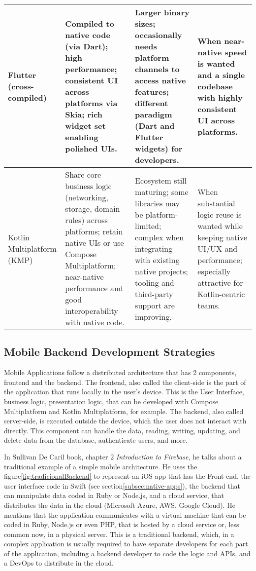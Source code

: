 \begin{table}[ht]
\begin{tabularx}{\textwidth}{|p{3.2cm}|Y|Y|Y|}
        Flutter (cross-compiled) &
        Compiled to native code (via Dart); high performance; consistent UI across platforms via Skia; rich widget set enabling polished UIs. &
        Larger binary sizes; occasionally needs platform channels to access native features; different paradigm (Dart and Flutter widgets) for developers. &
        When near-native speed is wanted and a single codebase with highly consistent UI across platforms. \\

        \hline

        Kotlin Multiplatform (KMP) &
        Share core business logic (networking, storage, domain rules) across platforms; retain native UIs or use Compose Multiplatform; near-native performance and good interoperability with native code. &
        Ecosystem still maturing; some libraries may be platform-limited; complex when integrating with existing native projects; tooling and third-party support are improving. &
        When  substantial logic reuse is wanted while keeping native UI/UX and performance; especially attractive for Kotlin-centric teams. \\
        \hline
    \end{tabularx}
\end{table}

\subsection{Mobile Backend Development Strategies}\label{sec:backend-strategies}

Mobile Applications follow a distributed architecture that has 2 components, frontend and the backend.
The frontend, also called the client-side is the part of the application that runs locally in the user's device.
This is the User Interface, business logic, presentation logic, that can be developed with Compose Multiplatform and Kotlin Multiplatform, for example.
The backend, also called server-side, is executed outside the device, which the user does not interact with directly.
This component can handle the data, reading, writing, updating, and delete data from the database, authenticate users, and more.

In Sullivan De Caril book, chapter 2 \textit{Introduction to Firebase}\cite{DeCarli2023}, he talks about a traditional example of a simple mobile architecture.
He uses the figure\ref{fig:tradicionalBackend} to represent an iOS app that has the Front-end, the user interface code in Swift (see section\ref{subsec:native-apps}), the backend that can manipulate data coded in Ruby or Node.js, and a cloud service, that distributes the data in the cloud (Microsoft Azure, AWS, Google Cloud).
He mentions that the application communicates with a virtual machine that can be coded in Ruby, Node.js or even PHP, that is hosted by a cloud service or, less common now, in a physical server.
This is a traditional backend, which, in a complex application is usually required to have separate developers for each part of the application, including a backend developer to code the logic and APIs, and a DevOps to distribute in the cloud\cite{DeCarli2023}.

